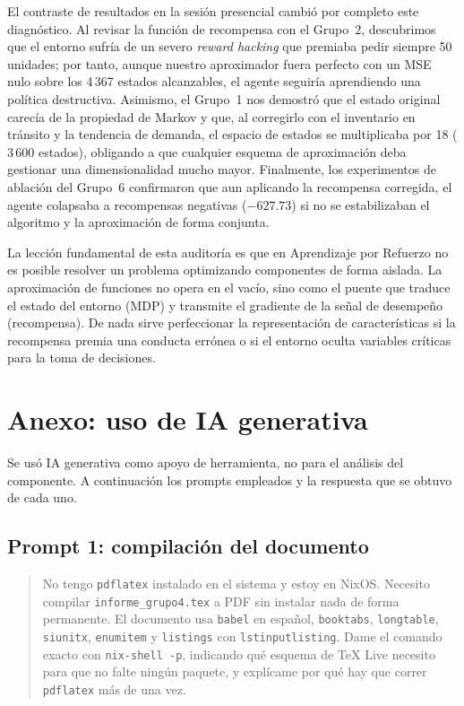\documentclass[11pt,letterpaper]{article}
\begin{document}
El contraste de resultados en la sesión presencial cambió por completo este diagnóstico. Al revisar la función de recompensa con el Grupo~2, descubrimos que el entorno sufría de un severo \textit{reward hacking} que premiaba pedir siempre 50 unidades; por tanto, aunque nuestro aproximador fuera perfecto con un MSE nulo sobre los 4\,367 estados alcanzables, el agente seguiría aprendiendo una política destructiva. Asimismo, el Grupo~1 nos demostró que el estado original carecía de la propiedad de Markov y que, al corregirlo con el inventario en tránsito y la tendencia de demanda, el espacio de estados se multiplicaba por 18 ($3\,600$ estados), obligando a que cualquier esquema de aproximación deba gestionar una dimensionalidad mucho mayor. Finalmente, los experimentos de ablación del Grupo~6 confirmaron que aun aplicando la recompensa corregida, el agente colapsaba a recompensas negativas ($-627.73$) si no se estabilizaban el algoritmo y la aproximación de forma conjunta.

La lección fundamental de esta auditoría es que en Aprendizaje por Refuerzo no es posible resolver un problema optimizando componentes de forma aislada. La aproximación de funciones no opera en el vacío, sino como el puente que traduce el estado del entorno (MDP) y transmite el gradiente de la señal de desempeño (recompensa). De nada sirve perfeccionar la representación de características si la recompensa premia una conducta errónea o si el entorno oculta variables críticas para la toma de decisiones.

\clearpage
\appendix
\section{Anexo: uso de IA generativa}

Se usó IA generativa como apoyo de herramienta, no para el análisis del componente.
A continuación los prompts empleados y la respuesta que se obtuvo de cada uno.

\subsection*{Prompt 1: compilación del documento}

\begin{quote}
\small
\ttfamily
No tengo \texttt{pdflatex} instalado en el sistema y estoy en NixOS. Necesito compilar
\texttt{informe\_grupo4.tex} a PDF sin instalar nada de forma permanente. El documento usa
\texttt{babel} en español, \texttt{booktabs}, \texttt{longtable}, \texttt{siunitx},
\texttt{enumitem} y \texttt{listings} con \texttt{lstinputlisting}. Dame el comando exacto
con \texttt{nix-shell -p}, indicando qué esquema de TeX Live necesito para que no
falte ningún paquete, y explícame por qué hay que correr \texttt{pdflatex} más de una vez.
\end{quote}
\end{document}
